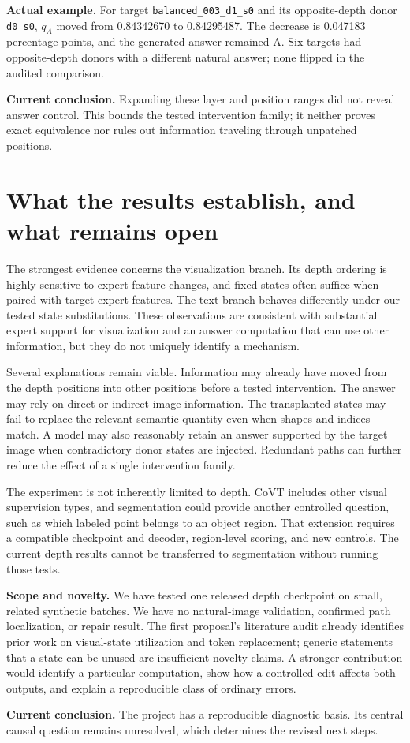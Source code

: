 \documentclass[11pt]{article}
\newcommand{\takeaway}[1]{\par\noindent\textbf{Current conclusion.} #1\par}
\begin{document}
\textbf{Actual example.} For target \texttt{balanced\_003\_d1\_s0} and its opposite-depth donor \texttt{d0\_s0}, $q_A$ moved from 0.84342670 to 0.84295487. The decrease is 0.047183 percentage points, and the generated answer remained A. Six targets had opposite-depth donors with a different natural answer; none flipped in the audited comparison.
\takeaway{Expanding these layer and position ranges did not reveal answer control. This bounds the tested intervention family; it neither proves exact equivalence nor rules out information traveling through unpatched positions.}
\FloatBarrier

\section{What the results establish, and what remains open}
The strongest evidence concerns the visualization branch. Its depth ordering is highly sensitive to expert-feature changes, and fixed states often suffice when paired with target expert features. The text branch behaves differently under our tested state substitutions. These observations are consistent with substantial expert support for visualization and an answer computation that can use other information, but they do not uniquely identify a mechanism.

Several explanations remain viable. Information may already have moved from the depth positions into other positions before a tested intervention. The answer may rely on direct or indirect image information. The transplanted states may fail to replace the relevant semantic quantity even when shapes and indices match. A model may also reasonably retain an answer supported by the target image when contradictory donor states are injected. Redundant paths can further reduce the effect of a single intervention family.

The experiment is not inherently limited to depth. CoVT includes other visual supervision types, and segmentation could provide another controlled question, such as which labeled point belongs to an object region. That extension requires a compatible checkpoint and decoder, region-level scoring, and new controls. The current depth results cannot be transferred to segmentation without running those tests.

\textbf{Scope and novelty.} We have tested one released depth checkpoint on small, related synthetic batches. We have no natural-image validation, confirmed path localization, or repair result. The first proposal's literature audit already identifies prior work on visual-state utilization and token replacement; generic statements that a state can be unused are insufficient novelty claims. A stronger contribution would identify a particular computation, show how a controlled edit affects both outputs, and explain a reproducible class of ordinary errors.
\takeaway{The project has a reproducible diagnostic basis. Its central causal question remains unresolved, which determines the revised next steps.}
\end{document}
